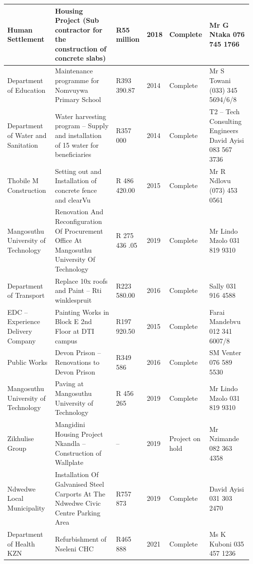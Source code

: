 \documentclass[a4paper,11pt]{article}
\begin{document}
{\begin{longtable}{@{} p{2.8cm} p{4.6cm} p{1.6cm} C{1.0cm} p{1.6cm} p{3.4cm} @{}}
  Human Settlement & Housing Project (Sub contractor for the construction of concrete slabs) & R55 million & 2018 & Complete & Mr G Ntaka 076 745 1766 \\
  \midrule
  Department of Education & Maintenance programme for Nomvuywa Primary School & R393 390.87 & 2014 & Complete & Mr S Towani (033) 345 5694/6/8 \\
  \midrule
  Department of Water and Sanitation & Water harvesting program – Supply and installation of 15 water for beneficiaries & R357 000 & 2014 & Complete & T2 – Tech Consulting Engineers David Ayisi 083 567 3736 \\
  \midrule
  Thobile M Construction & Setting out and Installation of concrete fence and clearVu & R 486 420.00 & 2015 & Complete & Mr R Ndlovu (073) 453 0561 \\
  \midrule
  Mangosuthu University of Technology & Renovation And Reconfiguration Of Procurement Office At Mangosuthu University Of Technology & R 275 436 .05 & 2019 & Complete & Mr Lindo Mzolo 031 819 9310 \\
  \midrule
  Department of Transport & Replace 10x roofs and Paint – Rti winklespruit & R223 580.00 & 2016 & Complete & Sally 031 916 4588 \\
  \midrule
  EDC – Experience Delivery Company & Painting Works in Block E 2nd Floor at DTI campus & R197 920.50 & 2015 & Complete & Farai Mandebvu 012 341 6007/8 \\
  \midrule
  Public Works & Devon Prison – Renovations to Devon Prison & R349 586 & 2016 & Complete & SM Venter 076 589 5530 \\
  \midrule
  Mangosuthu University of Technology & Paving at Mangosuthu University of Technology & R 456 265 & 2019 & Complete & Mr Lindo Mzolo 031 819 9310 \\
  \midrule
  Zikhulise Group & Mangidini Housing Project Nkandla – Construction of Wallplate & -- & 2019 & Project on hold & Mr Nzimande 082 363 4358 \\
  \midrule
  Ndwedwe Local Municipality & Installation Of Galvanised Steel Carports At The Ndwedwe Civic Centre Parking Area & R757 873 & 2019 & Complete & David Ayisi 031 303 2470 \\
  \midrule
  Department of Health KZN & Refurbishment of Nseleni CHC & R465 888 & 2021 & Complete & Ms K Kuboni 035 457 1236 \\

\end{longtable}}
\end{document}
